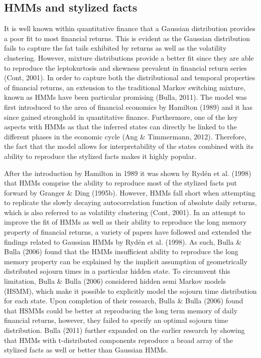 \subsection{HMMs and stylized facts}
It is well known within quantitative finance that a Gaussian distribution provides a poor fit to most financial returns. This is evident as the Gaussian distribution fails to capture the fat tails exhibited by returns as well as the volatility clustering. However, mixture distributions provide a better fit since they are able to reproduce the leptokurtosis and skewness prevalent in financial return series (Cont, 2001). In order to capture both the distributional and temporal properties of financial returns, an extension to the traditional Markov switching mixture, known as HMMs have been particular promising (Bulla, 2011). The model was first introduced to the area of financial economics by Hamilton (1989) and it has since gained stronghold in quantitative finance. Furthermore, one of the key aspects with HMMs as that the inferred states can directly be linked to the different phases in the economic cycle (Ang \& Timmermann, 2012). Therefore, the fact that the model allows for interpretability of the states combined with its ability to reproduce the stylized facts makes it highly popular. 

After the introduction by Hamilton in 1989 it was shown by Rydén et al. (1998) that HMMs comprise the ability to reproduce most of the stylized facts put forward by Granger \& Ding (1995b). However, HMMs fall short when attempting to replicate the slowly decaying autocorrelation function of absolute daily returns, which is also referred to as volatility clustering (Cont, 2001). In an attempt to improve the fit of HMMs as well as their ability to reproduce the long memory property of financial returns, a variety of papers have followed and extended the findings related to Gaussian HMMs by Rydén et al. (1998). As such, Bulla \& Bulla (2006) found that the HMMs insufficient ability to reproduce the long memory property can be explained by the implicit assumption of geometrically distributed sojourn times in a particular hidden state. To circumvent this limitation, Bulla \& Bulla (2006) considered hidden semi Markov models (HSMM), which make it possible to explicitly model the sojourn time distribution for each state. Upon completion of their research, Bulla \& Bulla (2006) found that HSMMs could be better at reproducing the long term memory of daily financial returns, however, they failed to specify an optimal sojourn time distribution. Bulla (2011) further expanded on the earlier research by showing that HMMs with t-distributed components reproduce a broad array of the stylized facts as well or better than Gaussian HMMs. 


